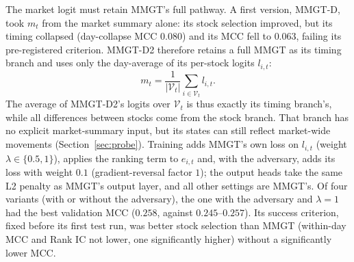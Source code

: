 \documentclass[conference]{IEEEtran}
\begin{document}
The market logit must retain MMGT's full pathway. A first version, MMGT-D, took $m_t$
from the market summary alone: its stock selection improved, but its timing
collapsed (day-collapse MCC $0.080$) and its MCC fell to $0.063$, failing its
pre-registered criterion. MMGT-D2 therefore retains a full MMGT as its timing branch and
uses only the day-average of its per-stock logits $l_{i,t}$:
\begin{equation}
m_t=\frac{1}{|\mathcal{V}_t|}\sum_{i\in\mathcal{V}_t} l_{i,t}.
\end{equation}
The average of MMGT-D2's logits over $\mathcal{V}_t$ is thus exactly its timing
branch's, while all
differences between stocks come from the stock branch. That branch has no explicit
market-summary input, but its states can still reflect market-wide movements
(Section~\ref{sec:probe}).
Training adds MMGT's own loss on $l_{i,t}$ (weight $\lambda\in\{0.5,1\}$), applies
the ranking term to $e_{i,t}$ and, with the adversary, adds its loss with weight $0.1$
(gradient-reversal factor $1$); the output heads take the same L2 penalty as MMGT's
output layer, and all other settings are MMGT's. Of four variants (with or without the adversary), the
one with the adversary and $\lambda=1$ had the best validation MCC ($0.258$, against
$0.245$--$0.257$). Its success criterion, fixed before its first test run, was
better stock selection than MMGT (within-day MCC and Rank IC not lower, one
significantly higher) without a significantly lower MCC.
\end{document}
